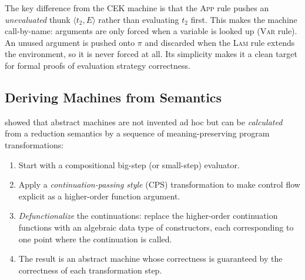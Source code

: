 \documentclass[11pt, a4paper]{article}
\theoremstyle{definition}
\theoremstyle{plain}
\theoremstyle{remark}
\begin{document}
The key difference from the CEK machine is that the \textsc{App} rule
pushes an \emph{unevaluated} thunk $\langle t_2, E \rangle$ rather than
evaluating $t_2$ first.  This makes the machine call-by-name: arguments
are only forced when a variable is looked up (\textsc{Var} rule).  An
unused argument is pushed onto $\pi$ and discarded when the \textsc{Lam}
rule extends the environment, so it is never forced at all.  Its
simplicity makes it a clean target for formal proofs of evaluation
strategy correctness.

\subsection{Deriving Machines from Semantics}

\citet{danvy2004,danvy2003secd} showed that abstract machines are not
invented ad hoc but can be \emph{calculated} from a reduction semantics
by a sequence of meaning-preserving program transformations:

\begin{enumerate}
  \item Start with a compositional big-step (or small-step) evaluator.
  \item Apply a \emph{continuation-passing style} (CPS) transformation to
        make control flow explicit as a higher-order function argument.
  \item \emph{Defunctionalize} the continuations: replace the higher-order
        continuation functions with an algebraic data type of constructors,
        each corresponding to one point where the continuation is called.
  \item The result is an abstract machine whose correctness is guaranteed by
        the correctness of each transformation step.
\end{enumerate}
\end{document}
